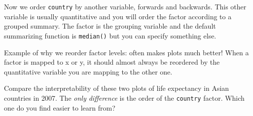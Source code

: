 \documentclass[
]{book}
\newenvironment{Shaded}{\begin{snugshade}}{\end{snugshade}}
\newcommand{\CommentTok}[1]{\textcolor[rgb]{0.56,0.35,0.01}{\textit{#1}}}
\newcommand{\DataTypeTok}[1]{\textcolor[rgb]{0.13,0.29,0.53}{#1}}
\newcommand{\KeywordTok}[1]{\textcolor[rgb]{0.13,0.29,0.53}{\textbf{#1}}}
\newcommand{\NormalTok}[1]{#1}
\newcommand{\OperatorTok}[1]{\textcolor[rgb]{0.81,0.36,0.00}{\textbf{#1}}}
\newcommand{\OtherTok}[1]{\textcolor[rgb]{0.56,0.35,0.01}{#1}}
\newcommand{\StringTok}[1]{\textcolor[rgb]{0.31,0.60,0.02}{#1}}
\begin{document}
Now we order \texttt{country} by another variable, forwards and backwards. This other variable is usually quantitative and you will order the factor according to a grouped summary. The factor is the grouping variable and the default summarizing function is \texttt{median()} but you can specify something else.

\begin{Shaded}
\end{Shaded}

Example of why we reorder factor levels: often makes plots much better! When a factor is mapped to x or y, it should almost always be reordered by the quantitative variable you are mapping to the other one.

Compare the interpretability of these two plots of life expectancy in Asian countries in 2007. The \emph{only difference} is the order of the \texttt{country} factor. Which one do you find easier to learn from?
\end{document}
